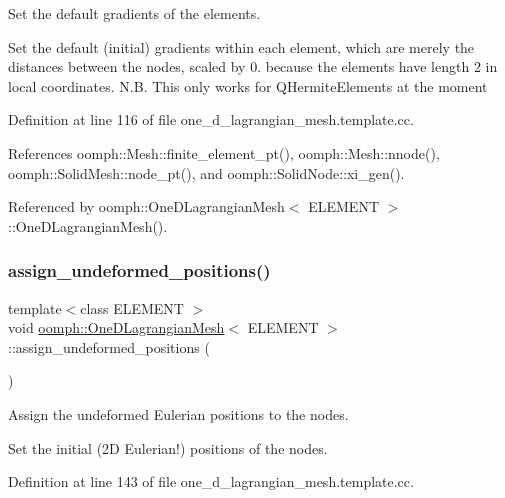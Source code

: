 Set the default gradients of the elements. 

Set the default (initial) gradients within each element, which are merely the distances between the nodes, scaled by 0. because the elements have length 2 in local coordinates. N.\+B. This only works for Q\+Hermite\+Elements at the moment 

Definition at line 116 of file one\+\_\+d\+\_\+lagrangian\+\_\+mesh.\+template.\+cc.



References oomph\+::\+Mesh\+::finite\+\_\+element\+\_\+pt(), oomph\+::\+Mesh\+::nnode(), oomph\+::\+Solid\+Mesh\+::node\+\_\+pt(), and oomph\+::\+Solid\+Node\+::xi\+\_\+gen().



Referenced by oomph\+::\+One\+D\+Lagrangian\+Mesh$<$ E\+L\+E\+M\+E\+N\+T $>$\+::\+One\+D\+Lagrangian\+Mesh().

\mbox{\label{classoomph_1_1OneDLagrangianMesh_a1eebb0eddd75a7c2847615c05b5fb4d8}} 
\subsubsection{\texorpdfstring{assign\+\_\+undeformed\+\_\+positions()}{assign\_undeformed\_positions()}}
{\footnotesize\ttfamily template$<$class E\+L\+E\+M\+E\+NT $>$ \\
void \hyperlink{classoomph_1_1OneDLagrangianMesh}{oomph\+::\+One\+D\+Lagrangian\+Mesh}$<$ E\+L\+E\+M\+E\+NT $>$\+::assign\+\_\+undeformed\+\_\+positions (\begin{DoxyParamCaption}{ }\end{DoxyParamCaption})\hspace{0.3cm}{\ttfamily [private]}}



Assign the undeformed Eulerian positions to the nodes. 

Set the initial (2D Eulerian!) positions of the nodes. 

Definition at line 143 of file one\+\_\+d\+\_\+lagrangian\+\_\+mesh.\+template.\+cc.



